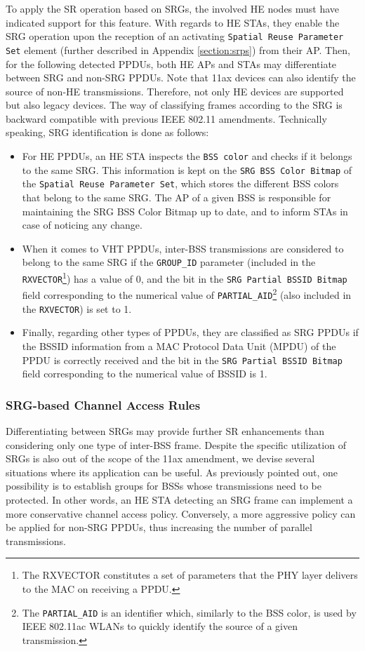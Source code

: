 \documentclass{ieeeaccess}
\begin{document}
To apply the SR operation based on SRGs, the involved HE nodes must have indicated support for this feature. With regards to HE STAs, they enable the SRG operation upon the reception of an activating \texttt{Spatial Reuse Parameter Set} element (further described in Appendix \ref{section:srps}) from their AP. Then, for the following detected PPDUs, both HE APs and STAs may differentiate between SRG and non-SRG PPDUs. Note that 11ax devices can also identify the source of non-HE transmissions. Therefore, not only HE devices are supported but also legacy devices. The way of classifying frames according to the SRG is backward compatible with previous IEEE 802.11 amendments. Technically speaking, SRG identification is done as follows:
\begin{itemize}
	\item For HE PPDUs, an HE STA inspects the \texttt{BSS color} and checks if it belongs to the same SRG. This information is kept on the \texttt{SRG BSS Color Bitmap} of the \texttt{Spatial Reuse Parameter Set}, which stores the different BSS colors that belong to the same SRG. The AP of a given BSS is responsible for maintaining the SRG BSS Color Bitmap up to date, and to inform STAs in case of noticing any change.
	\item When it comes to VHT PPDUs, inter-BSS transmissions are considered to belong to the same SRG if the \texttt{GROUP\_ID} parameter (included in the \texttt{RXVECTOR}\footnote{The RXVECTOR constitutes a set of parameters that the PHY layer delivers to the MAC on receiving a PPDU.}) has a value of 0, and the bit in the \texttt{SRG Partial BSSID Bitmap} field corresponding to the numerical value of \texttt{PARTIAL\_AID}\footnote{The \texttt{PARTIAL\_AID} is an identifier which, similarly to the BSS color, is used by IEEE 802.11ac WLANs to quickly identify the source of a given transmission.} (also included in the \texttt{RXVECTOR}) is set to 1. 
	\item Finally, regarding other types of PPDUs, they are classified as SRG PPDUs if the BSSID information from a MAC Protocol Data Unit (MPDU) of the PPDU is correctly received and the bit in the \texttt{SRG Partial BSSID Bitmap} field corresponding to the numerical value of BSSID is 1.
\end{itemize}

\subsubsection{SRG-based Channel Access Rules}
\label{section:srg_channel_access}
Differentiating between SRGs may provide further SR enhancements than considering only one type of inter-BSS frame. Despite the specific utilization of SRGs is also out of the scope of the 11ax amendment, we devise several situations where its application can be useful. As previously pointed out, one possibility is to establish groups for BSSs whose transmissions need to be protected. In other words, an HE STA detecting an SRG frame can implement a more conservative channel access policy. Conversely, a more aggressive policy can be applied for non-SRG PPDUs, thus increasing the number of parallel transmissions. 
\end{document}
